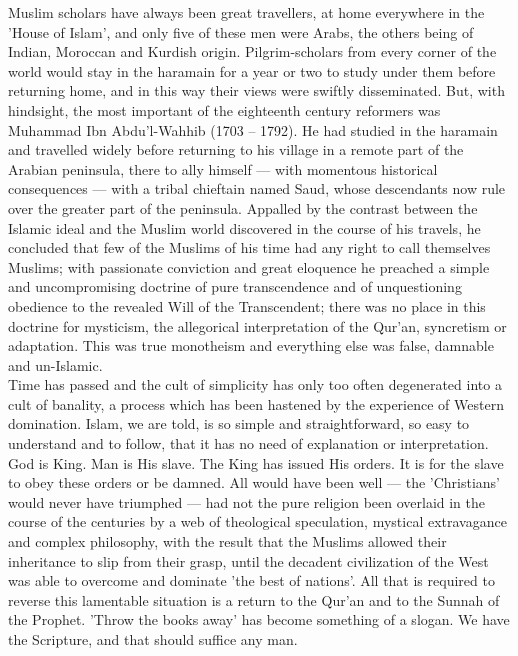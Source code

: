 \documentclass[10pt, twoside]{book}
\begin{document}
Muslim scholars have always been great travellers, at home everywhere in the 'House of Islam', and only five of these men were Arabs, the others being of Indian, Moroccan and Kurdish origin. Pilgrim\hyp{}scholars from every corner of the world would stay in the haramain for a year or two to study under them before returning home, and in this way their views were swiftly disseminated. But, with hindsight, the most important of the eighteenth century reformers was Muhammad Ibn Abdu'l\hyp{}Wahhib (1703 -- 1792). He had studied in the haramain and travelled widely before returning to his village in a remote part of the Arabian peninsula, there to ally himself --- with momentous historical consequences --- with a tribal chieftain named Saud, whose descendants now rule over the greater part of the peninsula. Appalled by the contrast between the Islamic ideal and the Muslim world discovered in the course of his travels, he concluded that few of the Muslims of his time had any right to call themselves Muslims; with passionate conviction and great eloquence he preached a simple and uncompromising doctrine of pure transcendence and of unquestioning obedience to the revealed Will of the Transcendent; there was no place in this doctrine for mysticism, the allegorical interpretation of the Qur'an, syncretism or adaptation. This was true monotheism and everything else was false, damnable and un\hyp{}Islamic. \\

Time has passed and the cult of simplicity has only too often degenerated into a cult of banality, a process which has been hastened by the experience of Western domination. Islam, we are told, is so simple and straightforward, so easy to understand and to follow, that it has no need of explanation or interpretation. God is King. Man is His slave. The King has issued His orders. It is for the slave to obey these orders or be damned. All would have been well --- the 'Christians' would never have triumphed --- had not the pure religion been overlaid in the course of the centuries by a web of theological speculation, mystical extravagance and complex philosophy, with the result that the Muslims allowed their inheritance to slip from their grasp, until the decadent civilization of the West was able to overcome and dominate 'the best of nations'. All that is required to reverse this lamentable situation is a return to the Qur'an and to the Sunnah of the Prophet. 'Throw the books away' has become something of a slogan. We have the Scripture, and that should suffice any man. \\
\end{document}
